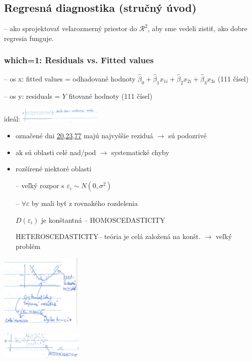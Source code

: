 \documentclass[unknownkeysallowed]{article}
\begin{document}
\subsection*{Regresná diagnostika (stručný úvod)}
-- ako sprojektovať veľarozmerný priestor do $\mathcal{R}^2$, aby sme vedeli zistiť, ako dobre regresia funguje.

\subsubsection*{which=1: Residuals vs. Fitted values}
-- os x: fitted values = odhadované hodnoty $\hat{\beta}_0 + \hat{\beta}_1x_{1i} + \hat{\beta}_2x_{2i} + \hat{\beta}_3x_{3i}$ (111 čísel)

-- os y: residuals = $Y$ fitované hodnoty (111 čísel)

ideál: \includegraphics[width=0.3\textwidth]{imgs/obr33.png}

\begin{multicols}{2}

\begin{itemize}
\item označené dni \underline{20,23,77} majú najvyššie reziduá $\to$ sú podozrivé
\item ak sú oblasti celé nad/pod $\to$ systematické chyby
\item rozšírené niektoré oblasti

	-- veľký rozpor s $\varepsilon_i \sim N(0, \sigma^2)$
	
	-- $\forall \varepsilon$ by mali byť z rovnakého rozdelenia
	
	$D(\varepsilon_i)$ je konštantná -- HOMOSCEDASTICITY
	
	HETEROSCEDASTICITY-- teória je celá založená na konšt. $\to$ veľký problém
\end{itemize}

\columnbreak

\includegraphics[width=0.3\textwidth]{imgs/obr34.png}

\vspace{5mm}

\includegraphics[width=0.3\textwidth]{imgs/obr35.png}

\end{multicols}
\end{document}
